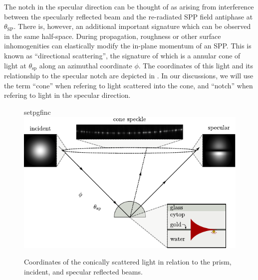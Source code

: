 The notch in the specular direction can be thought of as arising from 
interference between the specularly reflected beam and the
re-radiated SPP field antiphase at $\theta_\mathrm{SP}$.  There
is, however, an additional important signature which can be observed in the
same half-space.  During propagation, roughness or other surface
inhomogenities can elastically modify the in-plane momentum of an SPP.
This is known as ``directional scattering'', the signature of which is a
annular cone of light at $\theta_\mathrm{sp}$ along an azimuthal coordinate
$\phi$.  The coordinates of this light and its relationship to the specular
notch are depicted in .  In our 
discussions, we will use the term ``cone'' when refering to light scattered
into the cone, and ``notch'' when refering to light in the specular
direction.
\begin{figure}[ht]
 \centering
 {setpgfinc}
 \includegraphics{existence/figures/conefig}
 \caption{Coordinates of the conically scattered light in relation to the
 prism, incident, and specular reflected beams.}
 \label{fig:conefig}
\end{figure}

